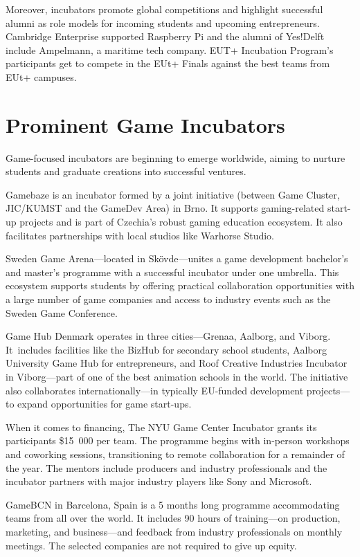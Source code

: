 Moreover, incubators promote global competitions and highlight successful alumni as role models for incoming students and upcoming entrepreneurs. Cambridge Enterprise supported Raspberry Pi and the alumni of Yes!Delft include Ampelmann, a maritime tech company. EUT+ Incubation Program’s participants get to compete in the EUt+ Finals against the best teams from EUt+ campuses.
\cite{cambridge-raspberry, yes-delft, cuni-nic}
\section{Prominent Game Incubators}
Game-focused incubators are beginning to emerge worldwide, aiming to nurture students and graduate creations into successful ventures. 

Gamebaze is an incubator formed by a joint initiative (between Game Cluster, JIC/KUMST and the GameDev Area) in Brno. It supports gaming-related start-up projects and is part of Czechia's robust gaming education ecosystem. It also facilitates partnerships with local studios like Warhorse Studio.
\cite{infinite-uni}

Sweden Game Arena---located in Skövde---unites a game development bachelor's and master's programme with a successful incubator under one umbrella. This ecosystem supports students by offering practical collaboration opportunities with a large number of game companies and access to industry events such as the Sweden Game Conference.
\cite{game-arena, education-msc-game-dev}

Game Hub Denmark operates in three cities---Grenaa, Aalborg, and Viborg. It~includes facilities like the BizHub for secondary school students, Aalborg University Game Hub for entrepreneurs, and Roof Creative Industries Incubator in Viborg---part of one of the best animation schools in the world. The initiative also collaborates internationally---in typically EU-funded development projects---to expand opportunities for game start-ups.
\cite{gh-denmark}

When it comes to financing, The NYU Game Center Incubator grants its participants \$15~000 per team. The programme begins with in-person workshops and coworking sessions, transitioning to remote collaboration for a remainder of the year. The mentors include producers and industry professionals and the incubator partners with major industry players like Sony and Microsoft.
\cite{nyu-game-center}

GameBCN in Barcelona, Spain is a 5 months long programme accommodating teams from all over the world. It includes 90 hours of training---on production, marketing, and business---and feedback from industry professionals on monthly meetings. The selected companies are not required to give up equity.
\cite{strategy-incubation}


